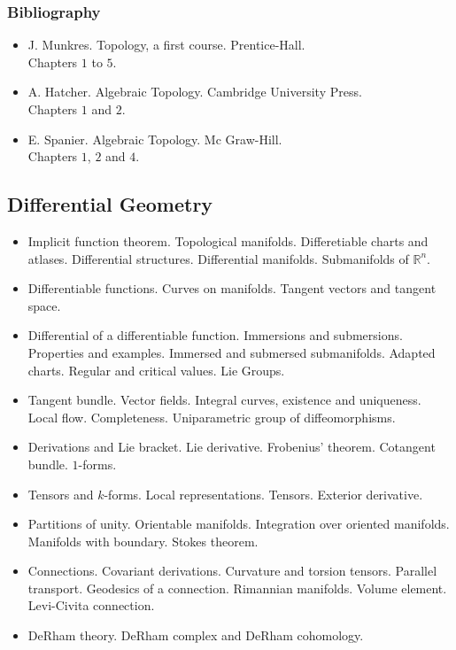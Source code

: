 \documentclass[spanish]{article}
\newcommand{\RR}{\mathbb{R}}
\begin{document}
\subsubsection{Bibliography}
\begin{itemize}
  \item
J. Munkres. Topology, a first course. Prentice-Hall.\\
Chapters $1$ to $5$.

  \item
A. Hatcher. Algebraic Topology. Cambridge University Press.\\
Chapters $1$ and $2$.

  \item
E. Spanier. Algebraic Topology. Mc Graw-Hill.\\
Chapters $1$, $2$ and $4$.

\end{itemize}


\hrulefill%


\subsection{Differential Geometry}

\begin{itemize}
  \item
Implicit function theorem. Topological manifolds. Differetiable charts and
atlases. Differential structures. Differential manifolds. Submanifolds
of $\RR^n$.

  \item
Differentiable functions. Curves on manifolds. Tangent vectors and tangent
space.

  \item
Differential of a differentiable function. Immersions and submersions.
Properties and examples. Immersed and submersed submanifolds. Adapted charts.
Regular and critical values. Lie Groups.

  \item
Tangent bundle. Vector fields. Integral curves, existence and uniqueness.
Local flow. Completeness. Uniparametric group of diffeomorphisms.

  \item
Derivations and Lie bracket. Lie derivative. Frobenius' theorem. Cotangent
bundle. $1$-forms.

  \item
Tensors and $k$-forms. Local representations. Tensors. Exterior derivative.

  \item
Partitions of unity. Orientable manifolds. Integration over oriented manifolds.
Manifolds with boundary. Stokes theorem.

  \item
Connections. Covariant derivations. Curvature and torsion tensors. Parallel
transport. Geodesics of a connection. Rimannian manifolds. Volume element.
Levi-Civita connection.

  \item
DeRham theory. DeRham complex and DeRham cohomology.

\end{itemize}
\end{document}
